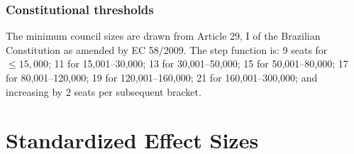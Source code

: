 \documentclass[12pt]{article}
\begin{document}
\subsubsection*{Constitutional thresholds} The minimum council sizes are drawn from Article 29, I of the Brazilian Constitution as amended by EC 58/2009. The step function is: 9 seats for $\leq 15,000$; 11 for 15,001--30,000; 13 for 30,001--50,000; 15 for 50,001--80,000; 17 for 80,001--120,000; 19 for 120,001--160,000; 21 for 160,001--300,000; and increasing by 2 seats per subsequent bracket.

\section{Standardized Effect Sizes}
\label{sec:sde}


\end{document}
